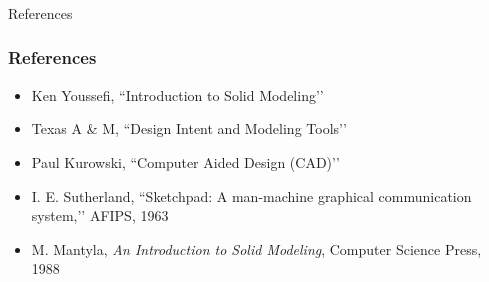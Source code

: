 \begin{frame}[fragile]\frametitle{}
\begin{center}
{\Large References}
\end{center}
\end{frame}


\begin{frame}[fragile]\frametitle{References}

\begin{itemize}
\item Ken Youssefi, ``Introduction to Solid Modeling’’
\item Texas A \& M, ``Design Intent and Modeling Tools’’
\item Paul Kurowski, ``Computer Aided Design (CAD)’’
\item I. E. Sutherland, ``Sketchpad: A man-machine graphical communication system,’’ AFIPS, 1963
\item M. Mantyla, \textit{An Introduction to Solid Modeling}, Computer Science Press, 1988
\end{itemize}
\end{frame}